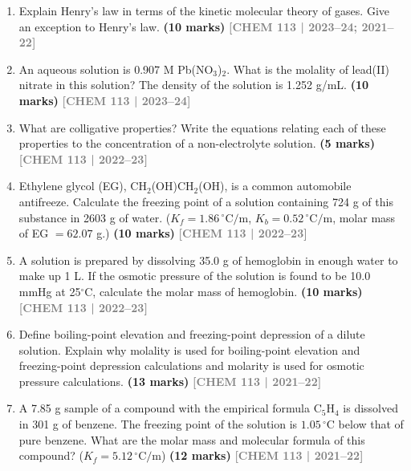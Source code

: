 \documentclass[12pt,a3paper]{article}
\newcommand{\yr}[1]{\hfill\textcolor{gray}{\small\textbf{[#1]}}}
\newcommand{\mk}[1]{\textcolor{orange!70!black}{\small\textbf{(#1 marks)}}}
\begin{document}
\begin{enumerate}
\item Explain Henry's law in terms of the kinetic molecular theory of gases. Give an exception to Henry's law. \mk{10}
\yr{CHEM 113 | 2023--24; 2021--22}




\item An aqueous solution is 0.907 M Pb(NO$_3$)$_2$. What is the molality of lead(II) nitrate in this solution? The density of the solution is 1.252 g/mL. \mk{10}
\yr{CHEM 113 | 2023--24}





\item What are colligative properties? Write the equations relating each of these properties to the concentration of a non-electrolyte solution. \mk{5}
\yr{CHEM 113 | 2022--23}



\item Ethylene glycol (EG), CH$_2$(OH)CH$_2$(OH), is a common automobile antifreeze. Calculate the freezing point of a solution containing 724 g of this substance in 2603 g of water. ($K_f = 1.86\,^\circ\text{C/m}$, $K_b = 0.52\,^\circ\text{C/m}$, molar mass of EG $= 62.07$ g.) \mk{10}
\yr{CHEM 113 | 2022--23}



\item A solution is prepared by dissolving 35.0 g of hemoglobin in enough water to make up 1 L. If the osmotic pressure of the solution is found to be 10.0 mmHg at 25$^\circ$C, calculate the molar mass of hemoglobin. \mk{10}
\yr{CHEM 113 | 2022--23}



\item Define boiling-point elevation and freezing-point depression of a dilute solution. Explain why molality is used for boiling-point elevation and freezing-point depression calculations and molarity is used for osmotic pressure calculations. \mk{13}
\yr{CHEM 113 | 2021--22}



\item A 7.85 g sample of a compound with the empirical formula C$_5$H$_4$ is dissolved in 301 g of benzene. The freezing point of the solution is $1.05\,^\circ$C below that of pure benzene. What are the molar mass and molecular formula of this compound? ($K_f = 5.12\,^\circ\text{C/m}$) \mk{12}
\yr{CHEM 113 | 2021--22}




\end{enumerate}
\end{document}
